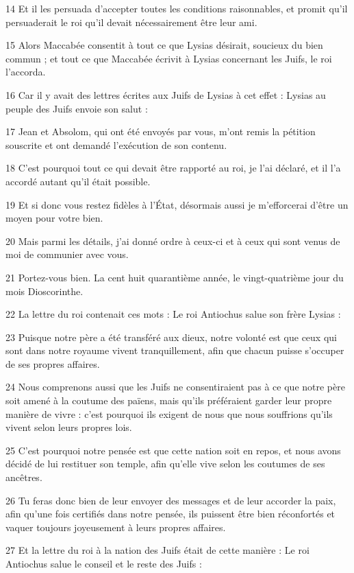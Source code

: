 \par 14 Et il les persuada d'accepter toutes les conditions raisonnables, et promit qu'il persuaderait le roi qu'il devait nécessairement être leur ami.
\par 15 Alors Maccabée consentit à tout ce que Lysias désirait, soucieux du bien commun ; et tout ce que Maccabée écrivit à Lysias concernant les Juifs, le roi l'accorda.
\par 16 Car il y avait des lettres écrites aux Juifs de Lysias à cet effet : Lysias au peuple des Juifs envoie son salut :
\par 17 Jean et Absolom, qui ont été envoyés par vous, m'ont remis la pétition souscrite et ont demandé l'exécution de son contenu.
\par 18 C'est pourquoi tout ce qui devait être rapporté au roi, je l'ai déclaré, et il l'a accordé autant qu'il était possible.
\par 19 Et si donc vous restez fidèles à l'État, désormais aussi je m'efforcerai d'être un moyen pour votre bien.
\par 20 Mais parmi les détails, j'ai donné ordre à ceux-ci et à ceux qui sont venus de moi de communier avec vous.
\par 21 Portez-vous bien. La cent huit quarantième année, le vingt-quatrième jour du mois Dioscorinthe.
\par 22 La lettre du roi contenait ces mots : Le roi Antiochus salue son frère Lysias :
\par 23 Puisque notre père a été transféré aux dieux, notre volonté est que ceux qui sont dans notre royaume vivent tranquillement, afin que chacun puisse s'occuper de ses propres affaires.
\par 24 Nous comprenons aussi que les Juifs ne consentiraient pas à ce que notre père soit amené à la coutume des païens, mais qu'ils préféraient garder leur propre manière de vivre : c'est pourquoi ils exigent de nous que nous souffrions qu'ils vivent selon leurs propres lois.
\par 25 C'est pourquoi notre pensée est que cette nation soit en repos, et nous avons décidé de lui restituer son temple, afin qu'elle vive selon les coutumes de ses ancêtres.
\par 26 Tu feras donc bien de leur envoyer des messages et de leur accorder la paix, afin qu'une fois certifiés dans notre pensée, ils puissent être bien réconfortés et vaquer toujours joyeusement à leurs propres affaires.
\par 27 Et la lettre du roi à la nation des Juifs était de cette manière : Le roi Antiochus salue le conseil et le reste des Juifs :
